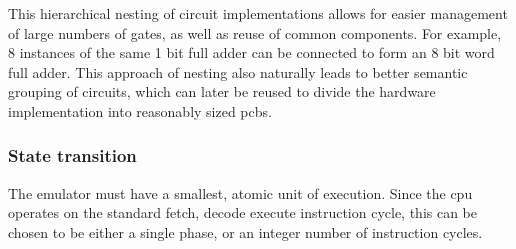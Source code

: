 This hierarchical nesting of circuit implementations allows for easier management of large numbers of gates, as well as reuse of common components. For example, 8 instances of the same 1 bit full adder can be connected to form an 8 bit word full adder. This approach of nesting also naturally leads to better semantic grouping of circuits, which can later be reused to divide the hardware implementation into reasonably sized \acp{pcb}.

\subsubsection{State transition}

The emulator must have a smallest, atomic unit of execution. Since the \ac{cpu} operates on the standard fetch, decode execute instruction cycle, this can be chosen to be either a single phase, or an integer number of instruction cycles. 
